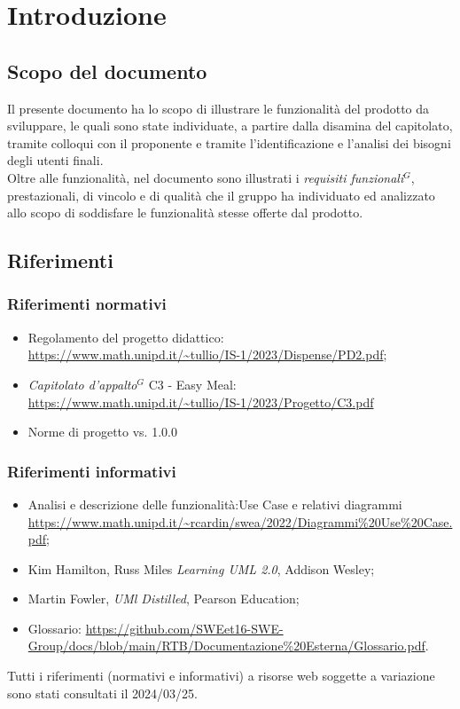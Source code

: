 \nonstopmode

\section{Introduzione}

\subsection{Scopo del documento}

Il presente documento ha lo scopo di illustrare le funzionalità del prodotto da sviluppare,
le quali sono state individuate, a partire dalla disamina del capitolato, tramite colloqui con
il proponente e tramite l'identificazione e l'analisi dei bisogni degli utenti finali.\\
Oltre alle funzionalità, nel documento sono illustrati i \emph{requisiti funzionali}$^{G}$, prestazionali, di
vincolo e di qualità che il gruppo ha individuato ed analizzato allo scopo di soddisfare le
funzionalità stesse offerte dal prodotto.

\subsection{Riferimenti}
\subsubsection{Riferimenti normativi}

\begin{itemize}
\item Regolamento del progetto didattico: \\ \url{https://www.math.unipd.it/~tullio/IS-1/2023/Dispense/PD2.pdf};
\item \emph{Capitolato d’appalto}$^{G}$ C3 - Easy Meal: \\ \url{https://www.math.unipd.it/~tullio/IS-1/2023/Progetto/C3.pdf} %
\item Norme di progetto vs. 1.0.0 %
\end{itemize}

\subsubsection{Riferimenti informativi}

\begin{itemize}
\item Analisi e descrizione delle funzionalità:Use Case e relativi diagrammi \url{https://www.math.unipd.it/~rcardin/swea/2022/Diagrammi%20Use%20Case.pdf};
\item Kim Hamilton, Russ Miles \emph{Learning UML 2.0}, Addison Wesley;
\item Martin Fowler, \emph{UMl Distilled}, Pearson Education;
\item Glossario: \url{https://github.com/SWEet16-SWE-Group/docs/blob/main/RTB/Documentazione%20Esterna/Glossario.pdf}.
\end{itemize}

Tutti i riferimenti (normativi e informativi) a risorse web soggette a variazione sono stati consultati il 2024/03/25.
